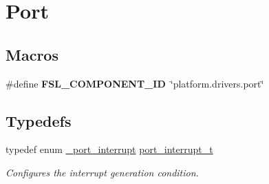 \hypertarget{group__port}{}\section{Port}
\label{group__port}
\subsection*{Macros}
\begin{DoxyCompactItemize}
\item 
\mbox{\label{group__port_ga2006f7918566cde9a2653e05380af6dd}} 
\#define {\bfseries F\+S\+L\+\_\+\+C\+O\+M\+P\+O\+N\+E\+N\+T\+\_\+\+ID}~\char`\"{}platform.\+drivers.\+port\char`\"{}
\end{DoxyCompactItemize}
\subsection*{Typedefs}
\begin{DoxyCompactItemize}
\item 
\mbox{\label{group__port_gaeb69517ed6497ab54c133fd9992c1842}} 
typedef enum \mbox{\hyperlink{group__port_gafd69f8203c1c62d7c81088dc92423dce}{\+\_\+port\+\_\+interrupt}} \mbox{\hyperlink{group__port_gaeb69517ed6497ab54c133fd9992c1842}{port\+\_\+interrupt\+\_\+t}}
\begin{DoxyCompactList}\small\item\em Configures the interrupt generation condition. \end{DoxyCompactList}\end{DoxyCompactItemize}

